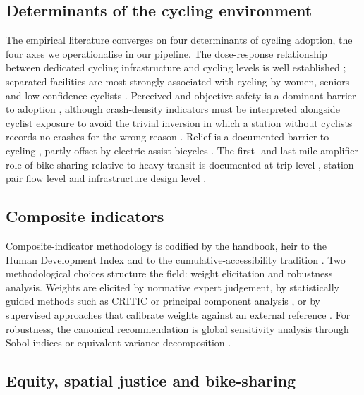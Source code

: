 \documentclass[11pt,a4paper]{article}
\begin{document}
\subsection{Determinants of the cycling environment}

The empirical literature converges on four determinants of cycling
adoption, the four axes we operationalise in our pipeline. The
dose-response relationship between dedicated cycling infrastructure
and cycling levels is well established \citep{Pucher2010,
Heinen2010, Buehler2012, Garrard2008, Schoner2014}; separated
facilities are most strongly associated with cycling by women,
seniors and low-confidence cyclists \citep{Garrard2012, Heinen2018,
Aldred2016}. Perceived and objective safety is a dominant barrier
to adoption \citep{Garrard2012, Reynolds2009, Pucher2010,
Aldred2016}, although crash-density indicators must be interpreted
alongside cyclist exposure to avoid the trivial inversion in which
a station without cyclists records no crashes for the wrong reason
\citep{Reynolds2009, Schepers2014}. Relief is a documented barrier
to cycling \citep{Parkin2008, Rietveld2004, Heinen2010}, partly
offset by electric-assist bicycles \citep{Fishman2016, Eren2020}.
The first- and last-mile amplifier role of bike-sharing relative
to heavy transit is documented at trip level \citep{Saberi2018},
station-pair flow level \citep{FaghihImani2014} and infrastructure
design level \citep{Martens2007, ElGeneidy2016}.

\subsection{Composite indicators}

Composite-indicator methodology is codified by the
\citet{OECD2008} handbook, heir to the Human Development Index
\citep{PNUD1990} and to the cumulative-accessibility tradition
\citep{Levinson2002, ElGeneidy2016}. Two methodological choices
structure the field: weight elicitation and robustness analysis.
Weights are elicited by normative expert judgement, by
statistically guided methods such as CRITIC \citep{Diakoulaki1995}
or principal component analysis \citep{Nardo2005}, or by
supervised approaches that calibrate weights against an external
reference \citep{Saisana2005, OECD2008}. For robustness, the
canonical recommendation is global sensitivity analysis through
Sobol indices or equivalent variance decomposition
\citep{Saltelli2008, Sobol1993}.

\subsection{Equity, spatial justice and bike-sharing}
\end{document}
